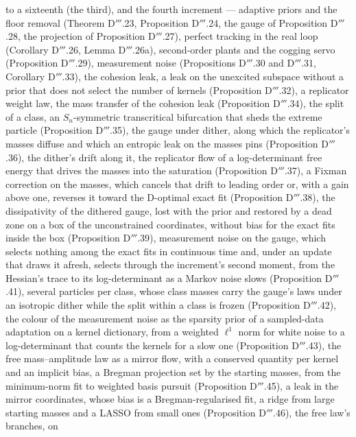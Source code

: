 \begin{itemize}
    to a sixteenth (the third), and the fourth increment --- adaptive priors and the floor removal (Theorem
    D$'''$.23, Proposition D$'''$.24, the gauge of Proposition D$'''$.28, the projection of Proposition D$'''$.27),
    perfect tracking in the real loop (Corollary D$'''$.26, Lemma D$'''$.26a), second-order plants and the cogging
    servo (Proposition D$'''$.29), measurement noise (Propositions D$'''$.30 and D$'''$.31, Corollary D$'''$.33),
    the cohesion leak, a leak on the unexcited subspace without a prior that does not select the number of kernels
    (Proposition D$'''$.32), a replicator weight law, the mass transfer of the cohesion leak (Proposition
    D$'''$.34), the split of a class, an $S_n$-symmetric transcritical bifurcation that sheds the extreme particle
    (Proposition D$'''$.35), the gauge under dither, along which the replicator's masses diffuse and which an entropic
    leak on the masses pins (Proposition D$'''$.36), the dither's drift along it, the replicator flow of a
    log-determinant free energy that drives the masses into the saturation (Proposition D$'''$.37), a Fixman correction
    on the masses, which cancels that drift to leading order or, with a gain above one, reverses it toward the
    D-optimal exact fit (Proposition D$'''$.38), the dissipativity of the dithered gauge, lost with the prior and
    restored by a dead zone on a box of the unconstrained coordinates, without bias for the exact fits inside the box
    (Proposition D$'''$.39), measurement noise on the gauge, which selects nothing among the exact fits in continuous
    time and, under an update that draws it afresh, selects through the increment's second moment, from the Hessian's
    trace to its log-determinant as a Markov noise slows (Proposition D$'''$.41), several particles per class, whose
    class masses carry the gauge's laws under an isotropic dither while the split within a class is frozen
    (Proposition D$'''$.42), the colour of the measurement noise as the sparsity prior of a sampled-data adaptation on
    a kernel dictionary, from a weighted $\ell^1$ norm for white noise to a log-determinant that counts the kernels for
    a slow one (Proposition D$'''$.43), the free mass--amplitude law as a mirror flow, with a conserved quantity per
    kernel and an implicit bias, a Bregman projection set by the starting masses, from the minimum-norm fit to weighted
    basis pursuit (Proposition D$'''$.45), a leak in the mirror coordinates, whose bias is a Bregman-regularised fit, a
    ridge from large starting masses and a LASSO from small ones (Proposition D$'''$.46), the free law's branches, on

\end{itemize}
